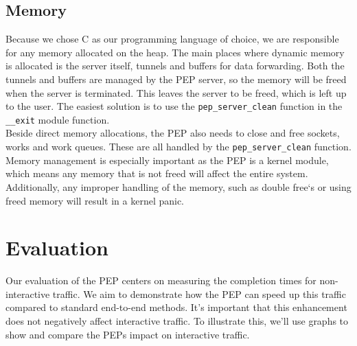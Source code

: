 \documentclass[a4paper,english, 11pt]{report}
\begin{document}
\section{Memory}
Because we chose C as our programming language of choice, we are responsible for any memory allocated on the heap. The main places where dynamic memory is allocated is the server itself, tunnels and buffers for data forwarding. Both the tunnels and buffers are managed by the PEP server, so the memory will be freed when the server is terminated. This leaves the server to be freed, which is left up to the user. The easiest solution is to use the \verb|pep_server_clean| function in the \verb|__exit| module function.\\

Beside direct memory allocations, the PEP also needs to close and free sockets, works and work queues. These are all handled by the \verb|pep_server_clean| function. Memory management is especially important as the PEP is a kernel module, which means any memory that is not freed will affect the entire system. Additionally, any improper handling of the memory, such as double free`s or using freed memory will result in a kernel panic.\\

\chapter{Evaluation}
Our evaluation of the PEP centers on measuring the completion times for non-interactive traffic. We aim to demonstrate how the PEP can speed up this traffic compared to standard end-to-end methods. It's important that this enhancement does not negatively affect interactive traffic. To illustrate this, we'll use graphs to show and compare the PEPs impact on interactive traffic.

%
\end{document}
